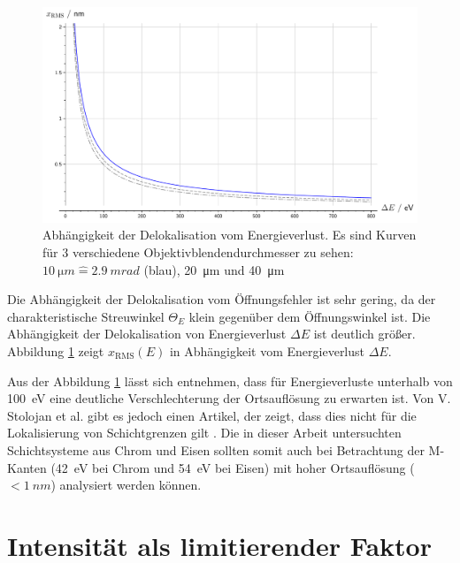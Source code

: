 \documentclass[
	paper=a4,				%
	twoside=true,			%
	BCOR=6mm,				%
	fontsize=12pt,			%
	pagesize=auto,			%
	numbers=noenddot,		%
	bibliography=totoc,		%
	draft=false
]{scrartcl}
\begin{document}
\begin{figure}
	\centering
	\includegraphics[width=1\linewidth]{../Jupyter-Notebooks/AnhangC/Bilder/delta_TM_loss}
	\caption{Abhängigkeit der Delokalisation vom Energieverlust. Es sind Kurven für 3 verschiedene Objektivblendendurchmesser zu sehen: $\SI{10}{\micro m} \mathrel{\hat=} \SI{2,9}{mrad}$ (blau), \SI{20}{\micro m} und \SI{40}{\micro m}}
	\label{fig:delta_TM_loss}
\end{figure}

Die Abhängigkeit der Delokalisation vom Öffnungsfehler ist sehr gering, da der charakteristische Streuwinkel $\Theta_E$ klein gegenüber dem Öffnungswinkel ist. Die Abhängigkeit der Delokalisation von Energieverlust $\Delta E$ ist deutlich größer. Abbildung \ref{fig:delta_TM_loss} zeigt $x_\mathrm{RMS}(E)$ in Abhängigkeit vom Energieverlust $\Delta E$.

Aus der Abbildung \ref{fig:delta_TM_loss} lässt sich entnehmen, dass für Energieverluste unterhalb von \SI{100}{eV} eine deutliche Verschlechterung der Ortsauflösung zu erwarten ist. Von V. Stolojan et al. gibt es jedoch einen Artikel, der zeigt, dass dies nicht für die Lokalisierung von Schichtgrenzen gilt \cite{stolojan_energy_2006}. Die in dieser Arbeit untersuchten Schichtsysteme aus Chrom und Eisen sollten somit auch bei Betrachtung der M-Kanten (\SI{42}{eV} bei Chrom und \SI{54}{eV} bei Eisen) mit hoher Ortsauflösung ($<\SI{1}{nm}$) analysiert werden können.

\section{Intensität als limitierender Faktor}
\end{document}
